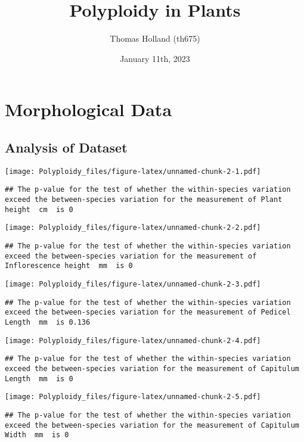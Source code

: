 \documentclass[
]{article}
\title{Polyploidy in Plants}
\author{Thomas Holland (th675)}
\date{January 11th, 2023}
\begin{document}
\maketitle

\hypertarget{morphological-data}{%
\section{Morphological Data}\label{morphological-data}}

\hypertarget{analysis-of-dataset}{%
\subsection{Analysis of Dataset}\label{analysis-of-dataset}}

\texttt{[image: Polyploidy\_files/figure-latex/unnamed-chunk-2-1.pdf]}

\begin{verbatim}
## The p-value for the test of whether the within-species variation exceed the between-species variation for the measurement of Plant height  cm  is 0
\end{verbatim}

\texttt{[image: Polyploidy\_files/figure-latex/unnamed-chunk-2-2.pdf]}

\begin{verbatim}
## The p-value for the test of whether the within-species variation exceed the between-species variation for the measurement of Inflorescence height  mm  is 0
\end{verbatim}

\texttt{[image: Polyploidy\_files/figure-latex/unnamed-chunk-2-3.pdf]}

\begin{verbatim}
## The p-value for the test of whether the within-species variation exceed the between-species variation for the measurement of Pedicel Length  mm  is 0.136
\end{verbatim}

\texttt{[image: Polyploidy\_files/figure-latex/unnamed-chunk-2-4.pdf]}

\begin{verbatim}
## The p-value for the test of whether the within-species variation exceed the between-species variation for the measurement of Capitulum Length  mm  is 0
\end{verbatim}

\texttt{[image: Polyploidy\_files/figure-latex/unnamed-chunk-2-5.pdf]}

\begin{verbatim}
## The p-value for the test of whether the within-species variation exceed the between-species variation for the measurement of Capitulum Width  mm  is 0
\end{verbatim}
\end{document}
